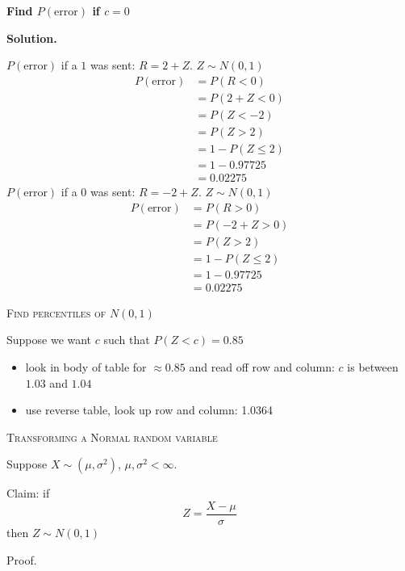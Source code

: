 \textbf{Find $P(\text{error})$ if $ c=0 $}

\textbf{Solution.}

$ P(\text{error}) $ if a $ 1 $ was sent: $ R =2+Z $. $ Z \sim N(0,1) $
\begin{align*}
    P(\text{error}) & =P(R<0)      \\
                    & =P(2+Z<0)    \\
                    & =P(Z<-2)     \\
                    & =P(Z>2)      \\
                    & =1-P(Z\le 2) \\
                    & =1-0.97725   \\
                    & =0.02275
\end{align*}
$ P(\text{error}) $ if a $ 0 $ was sent: $ R=-2+Z $. $ Z \sim N(0,1) $
\begin{align*}
    P(\text{error}) & =P(R>0)      \\
                    & =P(-2+Z>0)   \\
                    & =P(Z>2)      \\
                    & =1-P(Z\le 2) \\
                    & =1-0.97725   \\
                    & =0.02275
\end{align*}

\textsc{Find percentiles of $ N(0,1) $}

Suppose we want $ c $ such that $ P(Z<c)=0.85 $
\begin{itemize}
    \item look in body of table for $ \approx 0.85 $ and read off row and column: $ c $ is between $ 1.03 $ and $ 1.04 $
    \item use reverse table, look up row and column: 1.0364
\end{itemize}

\textsc{Transforming a Normal random variable}

Suppose $ X \sim (\mu,\sigma^2) $, $ \mu,\sigma^2<\infty $.

Claim: if
\[ Z=\frac{X-\mu}{\sigma}  \]
then $ Z \sim N(0,1) $

Proof.

